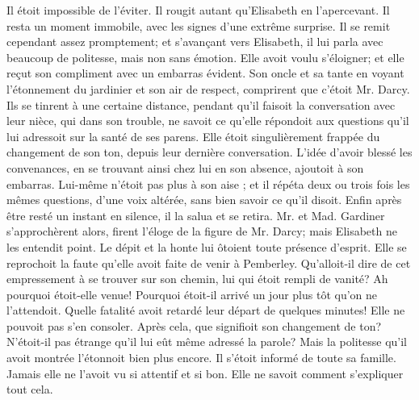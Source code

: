 Il étoit impossible de l’éviter. Il rougit autant qu’Elisabeth en l’apercevant. Il resta un moment immobile, avec les signes d’une extrême surprise. Il se remit cependant assez promptement; et s’avançant vers Elisabeth, il lui parla avec beaucoup de politesse, mais non sans émotion. Elle avoit voulu s’éloigner; et elle reçut son compliment avec un embarras évident. Son oncle et sa tante en voyant l’étonnement du jardinier et son air de respect, comprirent que c’étoit Mr. Darcy. Ils se tinrent à une certaine distance, pendant qu’il faisoit la conversation avec leur nièce, qui dans son trouble, ne savoit ce\setcounter{page}{107} qu'elle répondoit aux questions qu'il lui adressoit sur la santé de ses parens. Elle étoit singulièrement frappée du changement de son ton, depuis leur dernière conversation. L'idée d'avoir blessé les convenances, en se trouvant ainsi chez lui en son absence, ajoutoit à son embarras. Lui-même n'étoit pas plus à son aise ; et il répéta deux ou trois fois les mêmes questions, d'une voix altérée, sans bien savoir ce qu'il disoit. Enfin après être resté un instant en silence, il la salua et se retira.
Mr. et Mad. Gardiner s'approchèrent alors, firent l'éloge de la figure de Mr. Darcy; mais Elisabeth ne les entendit point. Le dépit et la honte lui ôtoient toute présence d'esprit. Elle se reprochoit la faute qu'elle avoit faite de venir à Pemberley. Qu'alloit-il dire de cet empressement à se trouver sur son chemin, lui qui étoit rempli de vanité? Ah pourquoi étoit-elle venue! Pourquoi étoit-il arrivé un jour plus tôt qu'on ne l'attendoit. Quelle fatalité avoit retardé leur départ de quelques minutes! Elle ne pouvoit pas s'en consoler. Après cela, que signifioit son changement de ton? N'étoit-il pas étrange qu'il lui eût même adressé la parole? Mais la politesse qu'il avoit montrée l'étonnoit bien plus encore. Il s'étoit informé de toute sa\setcounter{page}{108} famille. Jamais elle ne l'avoit vu si attentif et si bon. Elle ne savoit comment s'expliquer tout cela.

